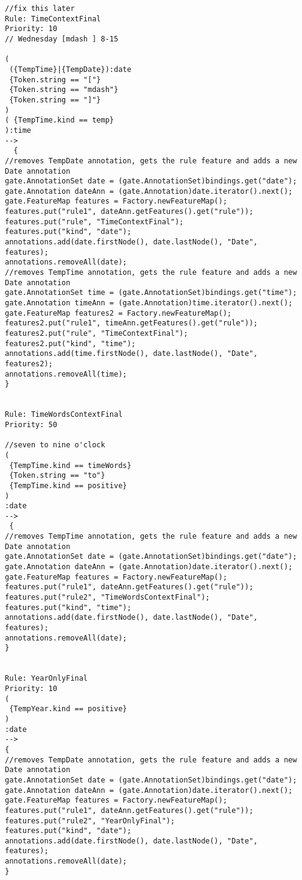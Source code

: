 \begin{verbatim}
//fix this later
Rule: TimeContextFinal
Priority: 10
// Wednesday [mdash ] 8-15

(
 ({TempTime}|{TempDate}):date
 {Token.string == "["}
 {Token.string == "mdash"}
 {Token.string == "]"}
)
( {TempTime.kind == temp}
):time
-->
  {
//removes TempDate annotation, gets the rule feature and adds a new Date annotation
gate.AnnotationSet date = (gate.AnnotationSet)bindings.get("date");
gate.Annotation dateAnn = (gate.Annotation)date.iterator().next();
gate.FeatureMap features = Factory.newFeatureMap();
features.put("rule1", dateAnn.getFeatures().get("rule"));
features.put("rule", "TimeContextFinal");
features.put("kind", "date");
annotations.add(date.firstNode(), date.lastNode(), "Date",
features);
annotations.removeAll(date);
//removes TempTime annotation, gets the rule feature and adds a new Date annotation
gate.AnnotationSet time = (gate.AnnotationSet)bindings.get("time");
gate.Annotation timeAnn = (gate.Annotation)time.iterator().next();
gate.FeatureMap features2 = Factory.newFeatureMap();
features2.put("rule1", timeAnn.getFeatures().get("rule"));
features2.put("rule", "TimeContextFinal");
features2.put("kind", "time");
annotations.add(time.firstNode(), date.lastNode(), "Date",
features2);
annotations.removeAll(time);
}


Rule: TimeWordsContextFinal
Priority: 50

//seven to nine o'clock
(
 {TempTime.kind == timeWords}
 {Token.string == "to"}
 {TempTime.kind == positive}
)
:date
-->
 {
//removes TempTime annotation, gets the rule feature and adds a new Date annotation
gate.AnnotationSet date = (gate.AnnotationSet)bindings.get("date");
gate.Annotation dateAnn = (gate.Annotation)date.iterator().next();
gate.FeatureMap features = Factory.newFeatureMap();
features.put("rule1", dateAnn.getFeatures().get("rule"));
features.put("rule2", "TimeWordsContextFinal");
features.put("kind", "time");
annotations.add(date.firstNode(), date.lastNode(), "Date",
features);
annotations.removeAll(date);
}


Rule: YearOnlyFinal
Priority: 10
(
 {TempYear.kind == positive}
)
:date
--> 
{
//removes TempDate annotation, gets the rule feature and adds a new Date annotation
gate.AnnotationSet date = (gate.AnnotationSet)bindings.get("date");
gate.Annotation dateAnn = (gate.Annotation)date.iterator().next();
gate.FeatureMap features = Factory.newFeatureMap();
features.put("rule1", dateAnn.getFeatures().get("rule"));
features.put("rule2", "YearOnlyFinal");
features.put("kind", "date");
annotations.add(date.firstNode(), date.lastNode(), "Date",
features);
annotations.removeAll(date);
}




\end{verbatim}
